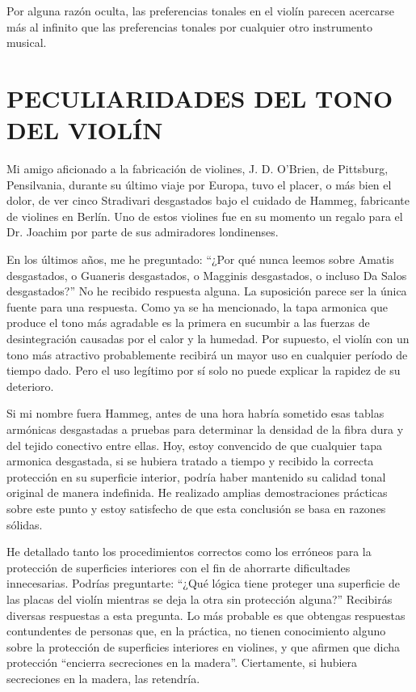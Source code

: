 \documentclass[12pt]{book}
\begin{document}
Por alguna razón oculta, las preferencias tonales en el violín parecen acercarse más al infinito que las preferencias tonales por cualquier otro instrumento musical.

\section*{PECULIARIDADES DEL TONO DEL VIOLÍN}

Mi amigo aficionado a la fabricación de violines, J. D. O'Brien, de Pittsburg, Pensilvania, durante su último viaje por Europa, tuvo el placer, o más bien el dolor, de ver cinco Stradivari desgastados bajo el cuidado de Hammeg, fabricante de violines en Berlín. Uno de estos violines fue en su momento un regalo para el Dr. Joachim por parte de sus admiradores londinenses.

En los últimos años, me he preguntado: ``¿Por qué nunca leemos sobre Amatis desgastados, o Guaneris desgastados, o Magginis desgastados, o incluso Da Salos desgastados?'' No he recibido respuesta alguna. La suposición parece ser la única fuente para una respuesta. Como ya se ha mencionado, la tapa armonica que produce el tono más agradable es la primera en sucumbir a las fuerzas de desintegración causadas por el calor y la humedad. Por supuesto, el violín con un tono más atractivo probablemente recibirá un mayor uso en cualquier período de tiempo dado. Pero el uso legítimo por sí solo no puede explicar la rapidez de su deterioro. 

Si mi nombre fuera Hammeg, antes de una hora habría sometido esas tablas armónicas desgastadas a pruebas para determinar la densidad de la fibra dura y del tejido conectivo entre ellas. Hoy, estoy convencido de que cualquier tapa armonica desgastada, si se hubiera tratado a tiempo y recibido la correcta protección en su superficie interior, podría haber mantenido su calidad tonal original de manera indefinida. He realizado amplias demostraciones prácticas sobre este punto y estoy satisfecho de que esta conclusión se basa en razones sólidas. 

He detallado tanto los procedimientos correctos como los erróneos para la protección de superficies interiores con el fin de ahorrarte dificultades innecesarias. Podrías preguntarte: ``¿Qué lógica tiene proteger una superficie de las placas del violín mientras se deja la otra sin protección alguna?'' Recibirás diversas respuestas a esta pregunta. Lo más probable es que obtengas respuestas contundentes de personas que, en la práctica, no tienen conocimiento alguno sobre la protección de superficies interiores en violines, y que afirmen que dicha protección ``encierra secreciones en la madera''. Ciertamente, si hubiera secreciones en la madera, las retendría. 
\end{document}
